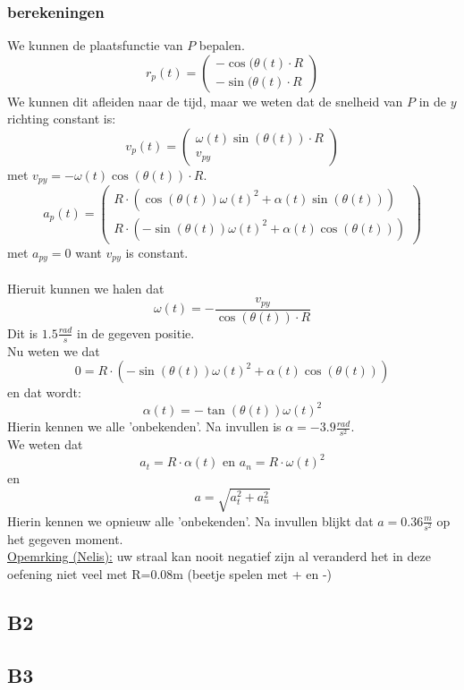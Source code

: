 \documentclass[10pt,a4paper]{article}
\begin{document}
\subsubsection*{berekeningen}
We kunnen de plaatsfunctie van $P$ bepalen.
\[
r_{p}(t)=
\begin{pmatrix}
-\cos{(\theta(t)}\cdot R\\
-\sin{(\theta(t)}\cdot R
\end{pmatrix}
\]
We kunnen dit afleiden naar de tijd, maar we weten dat de snelheid van $P$ in de $y$ richting constant is:
\[
v_{p}(t)=
\begin{pmatrix}
\omega(t)\sin{(\theta(t))}\cdot R\\
v_{py}
\end{pmatrix}
\]
met $v_{py} = -\omega(t)\cos{(\theta(t))}\cdot R$.
\[
a_{p}(t)=
\begin{pmatrix}
R\cdot(\cos{(\theta(t))}\omega(t)^{2} + \alpha(t)\sin{(\theta(t))})\\
R\cdot(-\sin{(\theta(t))}\omega(t)^{2} + \alpha(t)\cos{(\theta(t))})
\end{pmatrix}
\]
met $a_{py} = 0$ want $v_{py}$ is constant.
\\\\
Hieruit kunnen we halen dat
\[
\omega(t) = -\frac{v_{py}}{\cos{(\theta(t))}\cdot R}
\]
Dit is $1.5 \frac{rad}{s}$ in de gegeven positie.\\
Nu weten we dat
\[
0=R\cdot(-\sin{(\theta(t))}\omega(t)^{2} + \alpha(t)\cos{(\theta(t))})
\]
en dat wordt:
\[
\alpha(t) = -\tan{(\theta(t))}\omega(t)^{2}
\]
Hierin kennen we alle 'onbekenden'. Na invullen is $\alpha = -3.9\frac{rad}{s^{2}}$.\\
We weten dat
\[
a_{t} = R\cdot\alpha(t) \text{ en } a_{n} = R\cdot \omega(t)^{2}
\]
en
\[
a = \sqrt{a_{t}^{2} + a_{n}^{2}}
\]
Hierin kennen we opnieuw alle 'onbekenden'. Na invullen blijkt dat $a=0.36\frac{m}{s^{2}}$ op het gegeven moment.\\

\noindent \underline{Opemrking (Nelis):} uw straal kan nooit negatief zijn al veranderd het in deze oefening niet veel met R=0.08m (beetje spelen met + en -)
\subsection{B2}

\subsection{B3}
\end{document}
